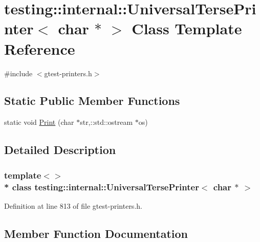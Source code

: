 \hypertarget{classtesting_1_1internal_1_1_universal_terse_printer_3_01char_01_5_01_4}{}\section{testing\+:\+:internal\+:\+:Universal\+Terse\+Printer$<$ char $\ast$ $>$ Class Template Reference}
\label{classtesting_1_1internal_1_1_universal_terse_printer_3_01char_01_5_01_4}


{\ttfamily \#include $<$gtest-\/printers.\+h$>$}

\subsection*{Static Public Member Functions}
\begin{DoxyCompactItemize}
\item 
static void \hyperlink{classtesting_1_1internal_1_1_universal_terse_printer_3_01char_01_5_01_4_a88c426f4af279251b4f4a02cd55ab57c}{Print} (char $\ast$str,\+::std\+::ostream $\ast$os)
\end{DoxyCompactItemize}


\subsection{Detailed Description}
\subsubsection*{template$<$$>$\\*
class testing\+::internal\+::\+Universal\+Terse\+Printer$<$ char $\ast$ $>$}



Definition at line 813 of file gtest-\/printers.\+h.



\subsection{Member Function Documentation}
